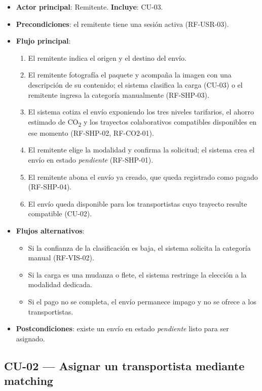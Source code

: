 {\begin{itemize}[leftmargin=2em]
    \item \textbf{Actor principal}: Remitente. \quad \textbf{Incluye}: CU-03.
    \item \textbf{Precondiciones}: el remitente tiene una sesión activa (RF-USR-03).
    \item \textbf{Flujo principal}:
    \begin{enumerate}[leftmargin=2em]
        \item El remitente indica el origen y el destino del envío.
        \item El remitente fotografía el paquete y acompaña la imagen con una descripción de su contenido; el sistema clasifica la carga (CU-03) o el remitente ingresa la categoría manualmente (RF-SHP-03).
        \item El sistema cotiza el envío exponiendo los tres niveles tarifarios, el ahorro estimado de CO\textsubscript{2} y los trayectos colaborativos compatibles disponibles en ese momento (RF-SHP-02, RF-CO2-01).
        \item El remitente elige la modalidad y confirma la solicitud; el sistema crea el envío en estado \emph{pendiente} (RF-SHP-01).
        \item El remitente abona el envío ya creado, que queda registrado como pagado (RF-SHP-04).
        \item El envío queda disponible para los transportistas cuyo trayecto resulte compatible (CU-02).
    \end{enumerate}
    \item \textbf{Flujos alternativos}:
    \begin{itemize}[leftmargin=2em]
        \item[2a.] Si la confianza de la clasificación es baja, el sistema solicita la categoría manual (RF-VIS-02).
        \item[4a.] Si la carga es una mudanza o flete, el sistema restringe la elección a la modalidad dedicada.
        \item[5a.] Si el pago no se completa, el envío permanece impago y no se ofrece a los transportistas.
    \end{itemize}
    \item \textbf{Postcondiciones}: existe un envío en estado \emph{pendiente} listo para ser asignado.
\end{itemize}

\subsection{CU-02 --- Asignar un transportista mediante matching}

}
